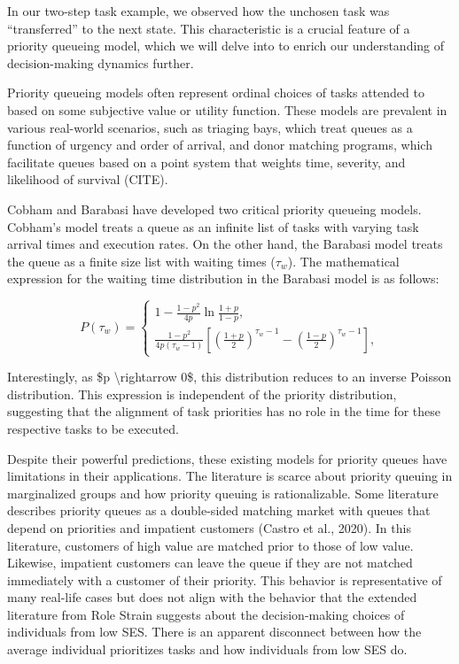 \documentclass[
]{report}
\begin{document}
In our two-step task example, we observed how the unchosen task was
``transferred'' to the next state. This characteristic is a crucial
feature of a priority queueing model, which we will delve into to enrich
our understanding of decision-making dynamics further.

Priority queueing models often represent ordinal choices of tasks
attended to based on some subjective value or utility function. These
models are prevalent in various real-world scenarios, such as triaging
bays, which treat queues as a function of urgency and order of arrival,
and donor matching programs, which facilitate queues based on a point
system that weights time, severity, and likelihood of survival (CITE).

Cobham and Barabasi have developed two critical priority queueing
models. Cobham's model treats a queue as an infinite list of tasks with
varying task arrival times and execution rates. On the other hand, the
Barabasi model treats the queue as a finite size list with waiting times
(\(\tau_w\)). The mathematical expression for the waiting time
distribution in the Barabasi model is as follows:

\[
P(\tau_w) = \left\{
            \begin{array}{ll}
            1 - \frac{1-p^2}{4p}\ln\frac{1+p}{1-p},\\
            \frac{1-p^2}{4p(\tau_w - 1)}[(\frac{1+p}{2})^{\tau_w-1} - (\frac{1-p}{2})^{\tau_w - 1}],
            \end{array}
            \right.
\]

Interestingly, as \$p \textbackslash rightarrow 0\$, this distribution
reduces to an inverse Poisson distribution. This expression is
independent of the priority distribution, suggesting that the alignment
of task priorities has no role in the time for these respective tasks to
be executed.

Despite their powerful predictions, these existing models for priority
queues have limitations in their applications. The literature is scarce
about priority queuing in marginalized groups and how priority queuing
is rationalizable. Some literature describes priority queues as a
double-sided matching market with queues that depend on priorities and
impatient customers (Castro et al., 2020). In this literature, customers
of high value are matched prior to those of low value. Likewise,
impatient customers can leave the queue if they are not matched
immediately with a customer of their priority. This behavior is
representative of many real-life cases but does not align with the
behavior that the extended literature from Role Strain suggests about
the decision-making choices of individuals from low SES. There is an
apparent disconnect between how the average individual prioritizes tasks
and how individuals from low SES do.
\end{document}
